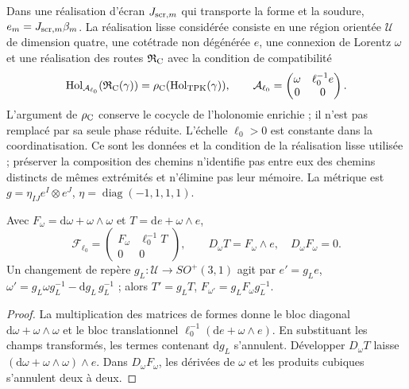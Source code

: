Dans une réalisation d’écran \(J_{{\rm scr},m}\) qui transporte la forme et la soudure, \(e_m=J_{{\rm scr},m}\beta_m\). La réalisation lisse considérée consiste en une région orientée \(\mathcal U\) de dimension quatre, une cotétrade non dégénérée \(e\), une connexion de Lorentz \(\omega\) et une réalisation des routes \(\mathfrak R_{\rm C}\) avec la condition de compatibilité
\begin{equation}
 \operatorname{Hol}_{\mathcal A_{\ell_0}}
          (\mathfrak R_{\rm C}(\gamma))
 =\rho_{\rm C}(\operatorname{Hol}_{\rm TPK}(\gamma)),\qquad
 \mathcal A_{\ell_0}=
 \begin{pmatrix}\omega&\ell_0^{-1}e\\0&0\end{pmatrix}.
\label{hmtcuatro:ant:compatibilidad-holonomia}
\end{equation}
L’argument de \(\rho_{\rm C}\) conserve le cocycle de l’holonomie enrichie ; il n’est pas remplacé par sa seule phase réduite. L’échelle \(\ell_0>0\) est constante dans la coordinatisation. Ce sont les données et la condition de la réalisation lisse utilisée ; préserver la composition des chemins n’identifie pas entre eux des chemins distincts de mêmes extrémités et n’élimine pas leur mémoire. La métrique est \(g=\eta_{IJ}e^I\otimes e^J\), \(\eta=\operatorname{diag}(-1,1,1,1)\).

\begin{proposition}
\label{hmtcuatro:ant:curvatura} Avec \(F_\omega=\mathrm d\omega+\omega\wedge\omega\) et \(T=\mathrm de+\omega\wedge e\),
\[
 \mathcal F_{\ell_0}=
 \begin{pmatrix}F_\omega&\ell_0^{-1}T\\0&0\end{pmatrix},
 \qquad D_\omega T=F_\omega\wedge e,\quad D_\omega F_\omega=0 .
\]
Un changement de repère \(g_L:\mathcal U\to SO^+(3,1)\) agit par \(e'=g_Le\), \(\omega'=g_L\omega g_L^{-1}-\mathrm dg_L\,g_L^{-1}\) ; alors \(T'=g_LT\), \(F_{\omega'}=g_LF_\omega g_L^{-1}\).
\end{proposition}
\begin{proof}
La multiplication des matrices de formes donne le bloc diagonal \(\mathrm d\omega+\omega\wedge\omega\) et le bloc translationnel \(\ell_0^{-1}(\mathrm de+\omega\wedge e)\). En substituant les champs transformés, les termes contenant \(\mathrm dg_L\) s’annulent. Développer \(D_\omega T\) laisse \((\mathrm d\omega+\omega\wedge\omega)\wedge e\). Dans \(D_\omega F_\omega\), les dérivées de \(\omega\) et les produits cubiques s’annulent deux à deux.
\end{proof}

